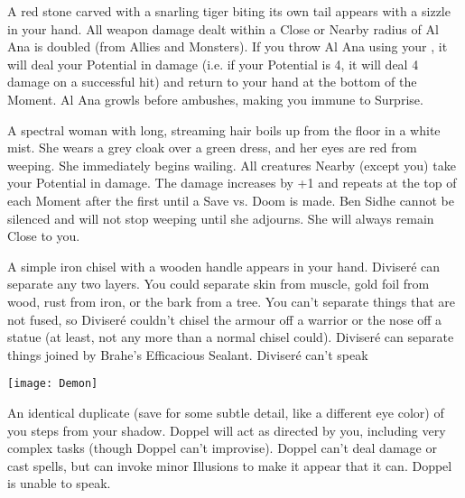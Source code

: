 {



A red stone carved with a snarling tiger biting its own tail appears with a sizzle in your hand.  All weapon damage dealt within a Close or Nearby radius of Al Ana is doubled (from Allies and Monsters).  If you throw Al Ana using your \DEX, it will deal your Potential in damage (i.e. if your Potential is 4, it will deal 4 damage on a successful hit) and return to your hand at the bottom of the Moment.  Al Ana growls before ambushes, making you immune to Surprise.


A spectral woman with long, streaming hair boils up from the floor in a white mist.  She wears a grey cloak over a green dress, and her eyes are red from weeping.  She immediately begins wailing.  All creatures Nearby (except you) take your Potential in damage.  The damage increases by +1 and repeats at the top of each Moment after the first until a Save vs. Doom is made.  Ben Sidhe cannot be silenced and will not stop weeping until she adjourns.  She will always remain Close to you.


A simple iron chisel with a wooden handle appears in your hand.  Diviseré can separate any two layers.  You could separate skin from muscle, gold foil from wood, rust from iron, or the bark from a tree. You can't separate things that are not fused, so Diviseré couldn't chisel the armour off a warrior or the nose off a statue (at least, not any more than a normal chisel could). Diviseré can separate things joined by Brahe's Efficacious Sealant.  Diviseré can't speak


  \texttt{[image: Demon]}

\cbreak


An identical duplicate (save for some subtle detail, like a different eye color) of you steps from your shadow.  Doppel will act as directed by you, including very complex tasks (though Doppel can't improvise).  Doppel can't deal damage or cast spells, but can invoke minor Illusions to make it appear that it can.  Doppel is unable to speak.

}
